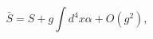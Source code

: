 \begin{equation}
\bar{S}=S+g\int d^{4}x\alpha +O\left( g^{2}\right) ,  \label{cin3a}
\end{equation}

